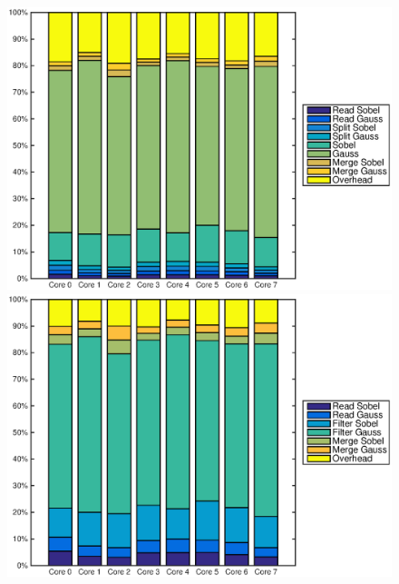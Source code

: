 \begin{figure}
    \centering
    \begin{minipage}{0.45\textwidth}
        \centering
        \includegraphics[width=0.99\linewidth]{images/openem_cifcif_8initial_func.eps}
    \end{minipage}
    \hfill
    \begin{minipage}{0.45\textwidth}
        \centering
        \includegraphics[width=0.99\linewidth]{images/openem_cifcif_8initial_eo.eps}
    \end{minipage}%
\end{figure}
